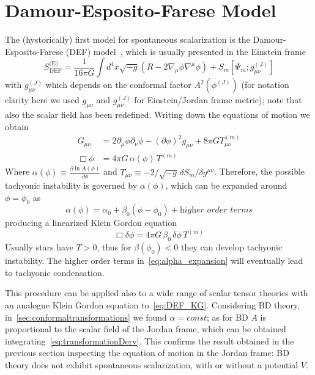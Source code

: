 \section{Damour-Esposito-Farese Model}
The (hystorically) first model for spontaneous scalarization is the Damour-Esposito-Farese (DEF) model~\cite{Esposito-Farese:1993gds}, which is usually presented in the Einstein frame
\begin{equation}\label{eq:DEFAction}
    S_{\text{DEF}}^{\text{(E)}} = \frac{1}{16\pi G} \int d^4x \sqrt{-g} \left( R - 2 \nabla_\mu \phi \nabla^\mu \phi \right) 
    + S_m [\Psi_m; g^{(J)}_{\mu\nu}]
\end{equation}
with $g^{(J)}_{\mu\nu}$ which depends on the conformal factor $A^2(\phi^{(J)})$ (for notation clarity here we used $g_{\mu\nu}$ and $g^{(J)}_{\mu\nu}$ for Einstein/Jordan frame metric); note that also the scalar field has been redefined. Writing down the equations of motion we obtain~\cite{Esposito-Farese:1993gds}
\begin{align}
    G_{\mu\nu} &= 2\partial_\mu \phi \partial_\nu \phi - \left(\partial \phi\right)^2 g_{\mu\nu}+ 8\pi G T_{\mu\nu}^{(m)} \\[6pt]
    \Box \phi &= 4\pi G \,\alpha(\phi)\, T^{(m)} \label{eq:DEF_KG}
\end{align}
Where $\alpha(\phi)\equiv \frac{\partial \ln{A(\phi)}}{\partial \phi}$ and $T_{\mu\nu} \equiv -2/\sqrt{-g} \, \delta S_m/\delta g^{\mu\nu}$.
Therefore, the possible tachyonic instability is governed by $\alpha(\phi)$, which can be expanded around $\phi = \phi_0$ as
\begin{equation}\label{eq:alpha_expansion}
    \alpha(\phi) = \alpha_0 + \beta_0 \left(\phi-\phi_0\right) + \textit{higher order terms}
\end{equation} 
producing a linearized Klein Gordon equation
\begin{equation}\label{eq:DEF_KG_linearized}
    \Box \delta \phi = 4\pi G \, \beta_0\, \delta \phi \, T^{(m)}
\end{equation}
Usually stars have $T>0$, thus for $\beta(\phi_0) <0$ they can develop tachyonic instability. The higher order terms in~\eqref{eq:alpha_expansion} will eventually lead to tachyonic condensation.

This procedure can be applied also to a wide range of scalar tensor theories with an analogue Klein Gordon equation to~\eqref{eq:DEF_KG}. Considering BD theory, in~\ref{sec:conformaltransformations} we found $\alpha = \textit{const}$; 
as for BD $A$ is proportional to the scalar field of the Jordan frame, which can be obtained integrating~\eqref{eq:transformationDerv}. This confirms the result obtained in the previous section inspecting the equation of motion in the Jordan frame: BD theory does not exhibit spontaneous scalarization, with or without a potential $V$.

